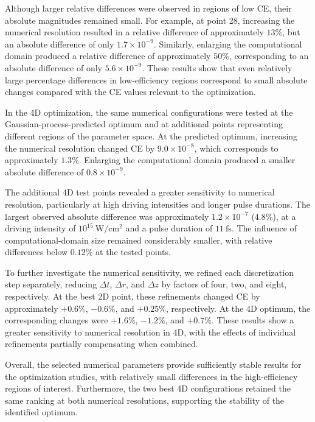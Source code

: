 \documentclass[11pt,a4paper]{article}
\begin{document}
Although larger relative differences were observed in regions of low CE, their absolute magnitudes remained small. For example, at point 28, increasing the numerical resolution resulted in a relative difference of approximately $13\%$, but an absolute difference of only $1.7\times10^{-9}$. Similarly, enlarging the computational domain produced a relative difference of approximately $50\%$, corresponding to an absolute difference of only $5.6\times10^{-9}$. These results show that even relatively large percentage differences in low-efficiency regions correspond to small absolute changes compared with the CE values relevant to the optimization.

In the 4D optimization, the same numerical configurations were tested at the Gaussian-process-predicted optimum and at additional points representing different regions of the parameter space. At the predicted optimum, increasing the numerical resolution changed CE by $9.0\times10^{-8}$, which corresponds to approximately $1.3\%$. Enlarging the computational domain produced a smaller absolute difference of $0.8\times10^{-9}$.

The additional 4D test points revealed a greater sensitivity to numerical resolution, particularly at high driving intensities and longer pulse durations. The largest observed absolute difference was approximately $1.2\times10^{-7}$ ($4.8\%$), at a driving intensity of $10^{15}~\mathrm{W/cm^2}$ and a pulse duration of $11~\mathrm{fs}$. The influence of computational-domain size remained considerably smaller, with relative differences below $0.12\%$ at the tested points.

To further investigate the numerical sensitivity, we refined each discretization step separately, reducing $\Delta t$, $\Delta r$, and $\Delta z$ by factors of four, two, and eight, respectively. At the best 2D point, these refinements changed CE by approximately $+0.6\%$, $-0.6\%$, and $+0.25\%$, respectively. At the 4D optimum, the corresponding changes were $+1.6\%$, $-1.2\%$, and $+0.7\%$. These results show a greater sensitivity to numerical resolution in 4D, with the effects of individual refinements partially compensating when combined.

Overall, the selected numerical parameters provide sufficiently stable results for the optimization studies, with relatively small differences in the high-efficiency regions of interest. Furthermore, the two best 4D configurations retained the same ranking at both numerical resolutions, supporting the stability of the identified optimum.
\end{document}
